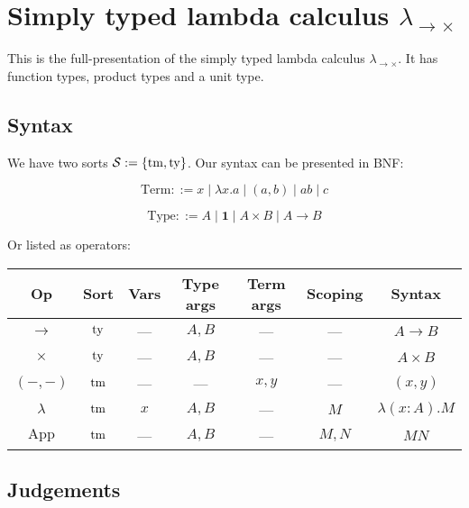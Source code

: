\section{Simply typed lambda calculus \texorpdfstring{$\lambda_{\to \times}$}{}}\label{stlc_rule}

This is the full-presentation of the simply typed lambda calculus $\lambda_{\to \times}$. It has function types, product types and a unit type.

\subsection{Syntax}\label{stlc_syntax}

We have two sorts $\mathcal{S} := \{ \mathrm{tm} , \mathrm{ty} \} $. Our syntax can be presented in BNF:

$$
    \mathrm{Term} ::= x \mid \lambda x . a \mid (a, b) \mid a b \mid c
$$

$$
    \mathrm{Type} ::= A \mid \mathbf{1} \mid A \times B \mid A \to B
$$

Or listed as operators:

\begin{center}
        \begin{tabular}{|c|c|c|c|c|c|c|}
        \hline Op & Sort & Vars & Type args & Term args & Scoping & Syntax \\
        \hline $\to$           & $\mathrm{ty}$ &  --- & $A,B$ &  ---  &  ---  & $A \to B$            \\
        \hline $\times$        & $\mathrm{ty}$ &  --- & $A,B$ &  ---  &  ---  & $A \times B$         \\
        \hline $(-,-)$         & $\mathrm{tm}$ &  --- &  ---  & $x,y$ &  ---  & $(x,y)$              \\
        \hline $\lambda$       & $\mathrm{tm}$ &  $x$ & $A,B$ &  ---  &  $M$  & $\lambda (x : A).M$  \\
        \hline $\mathrm{App}$  & $\mathrm{tm}$ &  --- & $A,B$ &  ---  & $M,N$ & $M N$ \\
        \hline
    \end{tabular}
\end{center}

\subsection{Judgements}\label{stlc_judgements}

